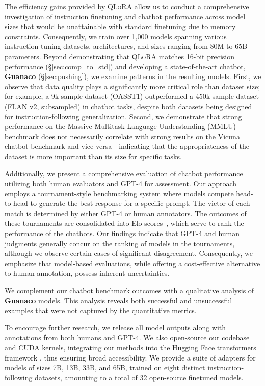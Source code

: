 The efficiency gains provided by \textsc{QLoRA} allow us to conduct a comprehensive investigation of instruction finetuning and chatbot performance across model sizes that would be unattainable with standard finetuning due to memory constraints. Consequently, we train over 1,000 models spanning various instruction tuning datasets, architectures, and sizes ranging from 80M to 65B parameters. Beyond demonstrating that \textsc{QLoRA} matches 16-bit precision performance (\S\ref{sec:comp_to_std}) and developing a state-of-the-art chatbot, \textbf{Guanaco} (\S\ref{sec:pushing}), we examine patterns in the resulting models. First, we observe that data quality plays a significantly more critical role than dataset size; for example, a 9k-sample dataset (OASST1) outperformed a 450k-sample dataset (FLAN v2, subsampled) in chatbot tasks, despite both datasets being designed for instruction-following generalization. Second, we demonstrate that strong performance on the Massive Multitask Language Understanding (MMLU) benchmark does not necessarily correlate with strong results on the Vicuna chatbot benchmark and vice versa—indicating that the appropriateness of the dataset is more important than its size for specific tasks.

Additionally, we present a comprehensive evaluation of chatbot performance utilizing both human evaluators and GPT-4 for assessment. Our approach employs a tournament-style benchmarking system where models compete head-to-head to generate the best response for a specific prompt. The victor of each match is determined by either GPT-4 or human annotators. The outcomes of these tournaments are consolidated into Elo scores~\citep{elo1967proposed, elo1978rating}, which serve to rank the performance of the chatbots. Our findings indicate that GPT-4 and human judgments generally concur on the ranking of models in the tournaments, although we observe certain cases of significant disagreement. Consequently, we emphasize that model-based evaluations, while offering a cost-effective alternative to human annotation, possess inherent uncertainties.

We complement our chatbot benchmark outcomes with a qualitative analysis of \textbf{Guanaco} models. This analysis reveals both successful and unsuccessful examples that were not captured by the quantitative metrics.

To encourage further research, we release all model outputs along with annotations from both humans and GPT-4. We also open-source our codebase and CUDA kernels, integrating our methods into the Hugging Face transformers framework \citep{wolf2019huggingface}, thus ensuring broad accessibility. We provide a suite of adapters for models of sizes 7B, 13B, 33B, and 65B, trained on eight distinct instruction-following datasets, amounting to a total of 32 open-source finetuned models.

